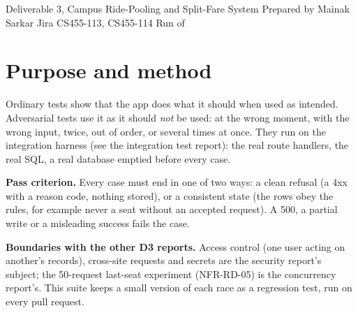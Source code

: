 \documentclass[10pt]{article}
\begin{document}
  {Deliverable 3, Campus Ride-Pooling and Split-Fare System}
  {Prepared by Mainak Sarkar \quad Jira CS455-113, CS455-114 \quad Run of \RunDate}


\section{Purpose and method}
Ordinary tests show that the app does what it should when used as intended. Adversarial tests
use it as it should \emph{not} be used: at the wrong moment, with the wrong input, twice, out of
order, or several times at once. They run on the integration harness (see the integration test
report): the real route handlers, the real SQL, a real database emptied before every case.

\textbf{Pass criterion.} Every case must end in one of two ways: a clean refusal (a 4xx with a
reason code, nothing stored), or a consistent state (the rows obey the rules, for example never
a seat without an accepted request). A 500, a partial write or a misleading success fails the
case.

\textbf{Boundaries with the other D3 reports.} Access control (one user acting on another's
records), cross-site requests and secrets are the security report's subject; the 50-request
last-seat experiment (NFR-RD-05) is the concurrency report's. This suite keeps a small version of
each race as a regression test, run on every pull request.
\end{document}
